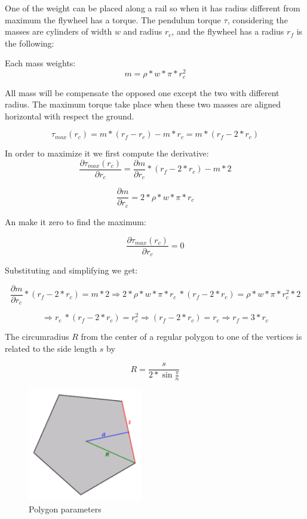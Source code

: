 One of the weight can be placed along a rail so when it has radius different from maximum the flywheel has a torque. The pendulum torque $\tau$, considering the masses are cylinders of width $w$ and radius $r_c$, and the flywheel has a radius $r_f$ is the following:

Each mass weights:
\[ m = \rho * w * \pi * r_c^2 \]

All mass will be compensate the opposed one except the two with different radius.
The maximum torque take place when these two masses are aligned horizontal with respect the ground.

\[ \tau _{max} (r_c) = m * (r_f - r_c) - m * r_c = m * (r_f - 2 * r_c) \]

In order to maximize it we first compute the derivative:
\[\frac{\partial \tau _{max} (r_c)}{\partial r_c} = \frac{\partial m}{\partial r_c} * (r_f - 2 * r_c) - m * 2\]

\[ \frac{\partial m}{\partial r_c} = 2 * \rho * w * \pi *  r_c\]

An make it zero to find the maximum:

\[\frac{\partial \tau _{max} (r_c)}{\partial r_c} = 0\]

Substituting and simplifying we get:

\[\frac{\partial m}{\partial r_c} * (r_f - 2 * r_c) =  m * 2 \Rightarrow 2 * \rho * w * \pi *  r_c\ * (r_f - 2 * r_c) = \rho * w * \pi * r_c^2 * 2 \]

\[ \Rightarrow r_c\ * (r_f - 2 * r_c) =  r_c^2 \Rightarrow (r_f - 2 * r_c) =  r_c \Rightarrow r_f = 3 * r_c\]


The circumradius $R$ from the center of a regular polygon to one of the vertices is related to the side length $s$ by

\[R=\frac {s}{2* \sin{\frac {\pi} {n}}}\]
\begin{figure}[h]
	\centering
	\includegraphics[width=5cm]{img/PolygonParameters.png}
	\caption{Polygon parameters}
	\label{fig:Polygon parameters}
\end{figure}

